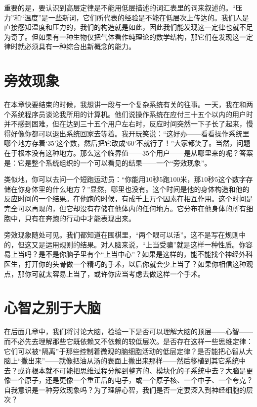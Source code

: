 重要的是，要认识到高层定律是不能用低层描述的词汇表里的词来叙述的。“压力”和“温度”是一些新词，它们所代表的经验是不能在低层次上传达的。我们人是直接感知温度和压力的，我们的构造就是如此，因此我们能发现这一定律也就不足为奇了。但如果有一种生物仅把气体看作纯理论的数学结构，那它们在发现这一定律时就必须具有一种综合出新概念的能力。

\section{旁效现象}

在本章快要结束的时候，我想讲一段与一个复杂系统有关的往事。一天，我在和两个系统程序员谈论我所用的计算机。他们说操作系统在应付三十五个以内的用户时并不感到困难，但在达到三十五个用户左右时，反应时间突然一下子长了起来，慢得好像你都可以退出系统回家去等着。我开玩笑说：“这好办——看看操作系统里哪个地方存着‘$35$’这个数，然后把它改成‘$60$’不就行了！”大家都笑了。当然，问题在于根本没有这种地方。那么这个临界值——$35$个用户——是从哪里来的呢？答案是：它是整个系统组织的一个可以看见的结果——一个“旁效现象”。

类似地，你可以去问一个短跑运动员：“你能用$10$秒$5$跑$100$米，那$10$秒$5$这个数字存储在你身体里的什么地方？”显然，哪里也没有。这个时间是他的身体构造和他的反应时间的一个结果。在他跑的时候，有成千上万个因素在相互作用。这个时间是完全可以再现的，但它却没有存储在他体内的任何地方。它分布在他身体的所有细胞中，只有在奔跑的行动中才能表现出来。

旁效现象随处可见。我们都知道在围棋里，“两个眼可以活”。这不是写在规则中的，但这又是运用规则的结果。对人脑来说，“上当受骗”就是这样一种性质。你容易上当吗？是不是你脑子里有个“上当中心”？如果是这样的，能不能找个神经外科医生，打开你的头骨做一个精巧的手术，以后你就会少上当了？如果你相信这种观点，那你可就太容易上当了，或许你应当考虑去做这样一个手术。

\section{心智之别于大脑}

在后面几章中，我们将讨论大脑，检验一下是否可以理解大脑的顶层——心智——而不必先去理解那些它既依赖又不依赖的较低层次。是否存在这样一些思维定律：它们可以被“隔离”于那些控制着微观的脑细胞活动的低层定律？是否能把心智从大脑上“撇出来”——就像把油从汤的表面上撇出来那样——然后移植到其它系统中去？或许根本就不可能把思维过程分解到整齐的、模块化的子系统中去？大脑是更像一个原子，还是更像一个重正后的电子，或一个原子核、一个中子、一个夸克？自我意识是一种旁效现象吗？为了理解心智，我们是否一定要深入到神经细胞的层次？
